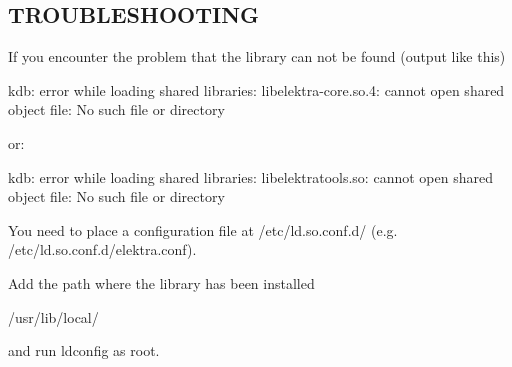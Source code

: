 \subsection*{T\+R\+O\+U\+B\+L\+E\+S\+H\+O\+O\+T\+I\+N\+G}

If you encounter the problem that the library can not be found (output like this) \begin{DoxyVerb}    kdb: error while loading shared libraries: libelektra-core.so.4: cannot open shared object file: No such file or directory
\end{DoxyVerb}


or\+: \begin{DoxyVerb}    kdb: error while loading shared libraries: libelektratools.so: cannot open shared object file: No such file or directory
\end{DoxyVerb}


You need to place a configuration file at {\ttfamily /etc/ld.so.\+conf.\+d/} (e.\+g. {\ttfamily /etc/ld.so.\+conf.\+d/elektra.conf}).

Add the path where the library has been installed \begin{DoxyVerb}    /usr/lib/local/
\end{DoxyVerb}


and run {\ttfamily ldconfig} as root. 